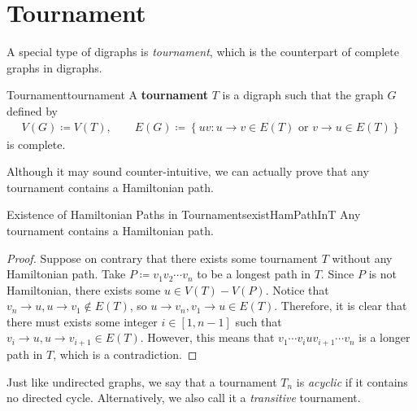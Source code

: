 \documentclass[math, code]{amznotes}
\theoremstyle{remark}
\begin{document}
\section{Tournament}
A special type of digraphs is \textit{tournament}, which is the counterpart of complete graphs in digraphs.
\begin{dfnbox}{Tournament}{tournament}
    A {\color{red} \textbf{tournament}} $T$ is a digraph such that the graph $G$ defined by 
    \begin{align*}
        V(G) \coloneqq V(T), \qquad E(G) \coloneqq \left\{uv \colon u \to v \in E(T) \textrm{ or } v \to u \in E(T)\right\}
    \end{align*}
    is complete.
\end{dfnbox}
Although it may sound counter-intuitive, we can actually prove that any tournament contains a Hamiltonian path.
\begin{probox}{Existence of Hamiltonian Paths in Tournaments}{existHamPathInT}
    Any tournament contains a Hamiltonian path.
    \tcblower
    \begin{proof}
        Suppose on contrary that there exists some tournament $T$ without any Hamiltonian path. Take $P \coloneqq v_1v_2\cdots v_n$ to be a longest path in $T$. Since $P$ is not Hamiltonian, there exists some $u \in V(T) - V(P)$. Notice that $v_n \to u, u \to v_1 \notin E(T)$, so $u \to v_n, v_1 \to u \in E(T)$. Therefore, it is clear that there must exists some integer $i \in [1, n - 1]$ such that $v_i \to u, u \to v_{i + 1} \in E(T)$. However, this means that $v_1\cdots v_iuv_{i + 1}\cdots v_n$ is a longer path in $T$, which is a contradiction.
    \end{proof}
\end{probox}
Just like undirected graphs, we say that a tournament $T_n$ is \textit{acyclic} if it contains no directed cycle. Alternatively, we also call it a \textit{transitive} tournament.
\end{document}
